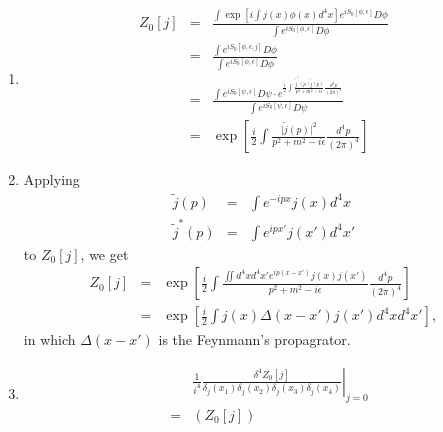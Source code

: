 \documentclass[12pt,a4paper]{article}
\begin{document}
\begin{enumerate}
\item

\begin{eqnarray*}
	Z_0[j] &=& \frac{ \int \exp\left[ i\int j(x)\phi(x)d^4x  \right] e^{iS_0[\phi,\epsilon] } D\phi }{ \int e^{i S_0[\phi,\epsilon]} D\phi } \\
	&=& \frac{\int e^{iS_0[\phi,\epsilon,j] }  D\phi  }{\int e^{i S_0[\phi,\epsilon]} D\phi} \\
	&=& \frac{ \int e^{i S_0[\psi,\epsilon]} D\psi \cdot e^{\frac i2 \int \frac{\tilde j^*(p) \tilde j(p)}{p^2+m^2-i\epsilon} \frac{d^4p}{(2\pi)^4}  }  }{ \int e^{i S_0[\psi,\epsilon]} D\psi}  \\
	&=& \exp\left[ \frac{i}{2} \int \frac{\vert\tilde j(p)\vert^2}{p^2 + m^2 -i\epsilon} \frac{d^4p}{(2\pi)^4} \right]
\end{eqnarray*}





\item

Applying
\begin{eqnarray*}
	\tilde j(p) &=& \int e^{-ipx}j(x)d^4x \\
	\tilde j^*(p)&=& \int e^{ipx'} j(x')d^4x'
\end{eqnarray*}
to $Z_0[j]$, we get
\begin{eqnarray*}
	Z_0[j]&=& \exp\left[ \frac i2 \int \frac{\iint d^4x d^4 x' e^{ip(x-x')}j(x)j(x')}{ p^2 + m^2 -i\epsilon } \frac{d^4 p}{(2\pi)^4} \right] \\
	&=& \exp\left[ \frac i 2 \int j(x)\Delta (x-x')j(x') d^4x d^4x' \right],
\end{eqnarray*}
in which $\Delta(x-x')$ is the Feynmann's propagrator.






\item

\begin{eqnarray*}
	&&\left.\frac{1}{i^4}\frac{\delta^4 Z_0[j]}{\delta_j(x_1)\delta_j(x_2) \delta_j(x_3) \delta_j(x_4)}\right\vert_{j=0} \\
	&=& \left( Z_0[j]     \right)
\end{eqnarray*}



























\end{enumerate}
\end{document}
